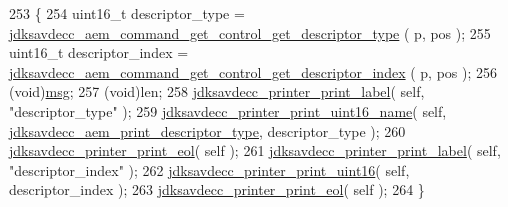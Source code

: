 \begin{DoxyCode}
253 \{
254     uint16\_t descriptor\_type = 
      \hyperlink{group__command__get__control_ga90f0fc2993ae0173e6b9ce2c6020440d}{jdksavdecc\_aem\_command\_get\_control\_get\_descriptor\_type}
      ( p, pos );
255     uint16\_t descriptor\_index = 
      \hyperlink{group__command__get__control_ga92af56dbbaac901e328c3c1b60b7ca47}{jdksavdecc\_aem\_command\_get\_control\_get\_descriptor\_index}
      ( p, pos );
256     (void)\hyperlink{maap__log__linux_8c_a0c7e58a50354c4a4d6dad428d0e47029}{msg};
257     (void)len;
258     \hyperlink{group__util_gaf7818b24143b3c7502926a425a242ff5}{jdksavdecc\_printer\_print\_label}( \textcolor{keyword}{self}, \textcolor{stringliteral}{"descriptor\_type"} );
259     \hyperlink{group__util_ga62486d864a66773d19bbbe23cebf346a}{jdksavdecc\_printer\_print\_uint16\_name}( \textcolor{keyword}{self}, 
      \hyperlink{group__aem__print_gabb4f27bdad61aeaf875d91f408b7199d}{jdksavdecc\_aem\_print\_descriptor\_type}, descriptor\_type );
260     \hyperlink{group__util_gacda56c9d3d24593a52c999682fa6e6e3}{jdksavdecc\_printer\_print\_eol}( \textcolor{keyword}{self} );
261     \hyperlink{group__util_gaf7818b24143b3c7502926a425a242ff5}{jdksavdecc\_printer\_print\_label}( \textcolor{keyword}{self}, \textcolor{stringliteral}{"descriptor\_index"} );
262     \hyperlink{group__util_ga9793e0ff8e7ed25d957282ee6b257ce2}{jdksavdecc\_printer\_print\_uint16}( \textcolor{keyword}{self}, descriptor\_index );
263     \hyperlink{group__util_gacda56c9d3d24593a52c999682fa6e6e3}{jdksavdecc\_printer\_print\_eol}( \textcolor{keyword}{self} );
264 \}
\end{DoxyCode}


